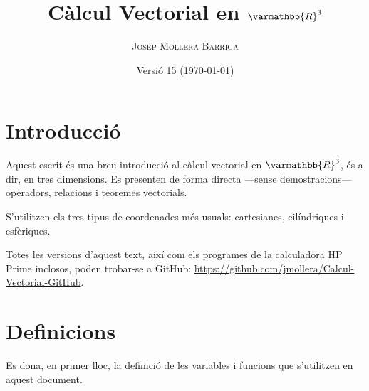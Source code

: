 \documentclass[catalan,a4paper,twoside,11pt]{article}
\begin{document}
\title{Càlcul Vectorial en $\varmathbb{R}^3$}
\author{\textsc{Josep Mollera Barriga}}
\date{Versió 15 (\today)}
\maketitle


\section{Introducció}

Aquest escrit és una breu introducció al càlcul vectorial en $\varmathbb{R}^3$, és a dir, en tres dimensions. Es presenten de forma directa ---sense demostracions--- operadors, relacions i teoremes vectorials.

S'utilitzen els tres tipus de coordenades més usuals:  cartesianes, 
cilíndriques i esfèriques.

Totes les versions d'aquest text, així com els programes de la calculadora \textsf{HP Prime} inclosos, poden trobar-se a GitHub: \href{https://github.com/jmollera/Calcul-Vectorial-GitHub}{https://github.com/jmollera/Calcul-Vectorial-GitHub}.


\section{Definicions}

Es dona, en primer lloc, la definició de les variables i funcions que s'utilitzen en aquest document.
\end{document}
